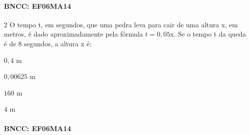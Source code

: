 {\paragraph{BNCC: EF06MA14 }


\num{2}  O tempo t, em segundos, que uma pedra leva para cair de uma altura x,
em metros, é dado aproximadamente pela fórmula $t = 0,05$x. Se o tempo t
da queda é de $8$ segundos, a altura x é:

\begin{escolha}
\item $0,4$ m
\item $0,00625$ m
\item $160$ m
\item $4$ m
\end{escolha}

\paragraph{BNCC: EF06MA14 }


}
